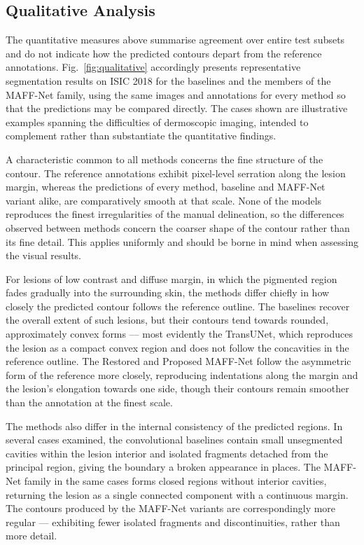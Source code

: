 \subsection{Qualitative Analysis}

The quantitative measures above summarise agreement over entire test subsets and do not indicate how the predicted contours depart from the reference annotations. Fig.~\ref{fig:qualitative} accordingly presents representative segmentation results on ISIC 2018 for the baselines and the members of the MAFF-Net family, using the same images and annotations for every method so that the predictions may be compared directly. The cases shown are illustrative examples spanning the difficulties of dermoscopic imaging, intended to complement rather than substantiate the quantitative findings.

A characteristic common to all methods concerns the fine structure of the contour. The reference annotations exhibit pixel-level serration along the lesion margin, whereas the predictions of every method, baseline and MAFF-Net variant alike, are comparatively smooth at that scale. None of the models reproduces the finest irregularities of the manual delineation, so the differences observed between methods concern the coarser shape of the contour rather than its fine detail. This applies uniformly and should be borne in mind when assessing the visual results.

For lesions of low contrast and diffuse margin, in which the pigmented region fades gradually into the surrounding skin, the methods differ chiefly in how closely the predicted contour follows the reference outline. The baselines recover the overall extent of such lesions, but their contours tend towards rounded, approximately convex forms --- most evidently the TransUNet, which reproduces the lesion as a compact convex region and does not follow the concavities in the reference outline. The Restored and Proposed MAFF-Net follow the asymmetric form of the reference more closely, reproducing indentations along the margin and the lesion's elongation towards one side, though their contours remain smoother than the annotation at the finest scale.

The methods also differ in the internal consistency of the predicted regions. In several cases examined, the convolutional baselines contain small unsegmented cavities within the lesion interior and isolated fragments detached from the principal region, giving the boundary a broken appearance in places. The MAFF-Net family in the same cases forms closed regions without interior cavities, returning the lesion as a single connected component with a continuous margin. The contours produced by the MAFF-Net variants are correspondingly more regular --- exhibiting fewer isolated fragments and discontinuities, rather than more detail.

